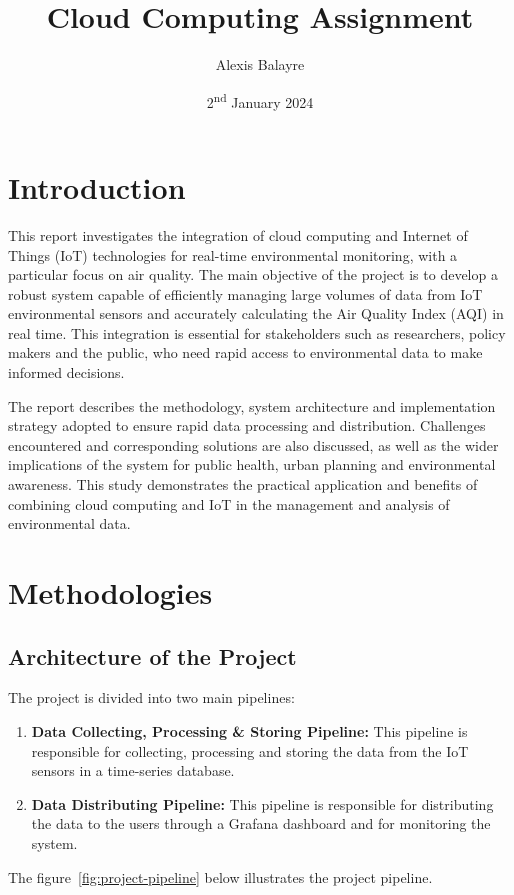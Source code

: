 \documentclass[12pt,oneside]{book} %
\title{Cloud Computing Assignment}
\author{Alexis Balayre}
\date{2\textsuperscript{nd} January 2024}
\begin{document}
\frontmatter

\maketitle

{
    \clearpage
    \singlespacing
    {
        \tableofcontents
    }
    \clearpage

    \listoffigures

    \listoftables
}

\mainmatter
\pagestyle{fancy}
\fancyhead[L]{\nouppercase{\leftmark}}
\fancyhead[R]{\nouppercase{\rightmark}}

\chapter{Introduction}
This report investigates the integration of cloud computing and Internet of
Things (IoT) technologies for real-time environmental monitoring, with a
particular focus on air quality. The main objective of the project is to
develop a robust system capable of efficiently managing large volumes of data
from IoT environmental sensors and accurately calculating the Air Quality Index
(AQI) in real time. This integration is essential for stakeholders such as
researchers, policy makers and the public, who need rapid access to
environmental data to make informed decisions.

The report describes the methodology, system architecture and implementation
strategy adopted to ensure rapid data processing and distribution. Challenges
encountered and corresponding solutions are also discussed, as well as the
wider implications of the system for public health, urban planning and
environmental awareness. This study demonstrates the practical application and
benefits of combining cloud computing and IoT in the management and analysis of
environmental data.

\chapter{Methodologies}\label{chap:one}

\section{Architecture of the Project}
The project is divided into two main pipelines:
\begin{enumerate}
    \item \textbf{Data Collecting, Processing \& Storing Pipeline:} This pipeline is responsible for collecting, processing and storing the data from the IoT sensors in a time-series database.
    \item \textbf{Data Distributing Pipeline:} This pipeline is responsible for distributing the data to the users through a Grafana dashboard and for monitoring the system.
\end{enumerate}
The figure~\ref{fig:project-pipeline} below illustrates the project pipeline.
\end{document}

